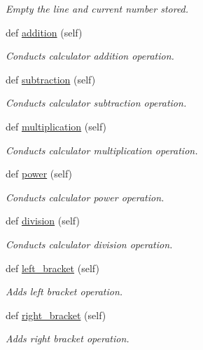 \begin{DoxyCompactItemize}
\begin{DoxyCompactList}\small\item\em Empty the line and current number stored. \end{DoxyCompactList}\item 
def \hyperlink{classmain_1_1_main_window_ad3673a13020c18149857ca57cbd13303}{addition} (self)
\begin{DoxyCompactList}\small\item\em Conducts calculator addition operation. \end{DoxyCompactList}\item 
def \hyperlink{classmain_1_1_main_window_a11dbd9c961cc33a4fe1bb87226810bca}{subtraction} (self)
\begin{DoxyCompactList}\small\item\em Conducts calculator subtraction operation. \end{DoxyCompactList}\item 
def \hyperlink{classmain_1_1_main_window_ac01c5ab4257a8aac093821c829ebbcd2}{multiplication} (self)
\begin{DoxyCompactList}\small\item\em Conducts calculator multiplication operation. \end{DoxyCompactList}\item 
def \hyperlink{classmain_1_1_main_window_a477f4d4d5bb5ef2805a250a36745ab4b}{power} (self)
\begin{DoxyCompactList}\small\item\em Conducts calculator power operation. \end{DoxyCompactList}\item 
def \hyperlink{classmain_1_1_main_window_a74162ce8832ff39d12773e129aaca8fb}{division} (self)
\begin{DoxyCompactList}\small\item\em Conducts calculator division operation. \end{DoxyCompactList}\item 
def \hyperlink{classmain_1_1_main_window_a2e0fc10335f0a466d3681cb2ca47d72c}{left\+\_\+bracket} (self)
\begin{DoxyCompactList}\small\item\em Adds left bracket operation. \end{DoxyCompactList}\item 
def \hyperlink{classmain_1_1_main_window_a5685744d7001c36a299b5e7ce984cf92}{right\+\_\+bracket} (self)
\begin{DoxyCompactList}\small\item\em Adds right bracket operation. \end{DoxyCompactList}\item 

\end{DoxyCompactItemize}
